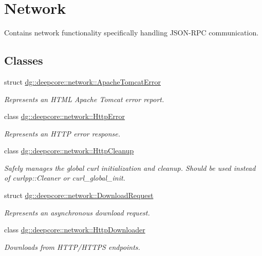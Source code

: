 \hypertarget{group___network_module}{}\section{Network}
\label{group___network_module}


Contains network functionality specifically handling J\+S\+O\+N-\/\+R\+PC communication.  


\subsection*{Classes}
\begin{DoxyCompactItemize}
\item 
struct \hyperlink{structdg_1_1deepcore_1_1network_1_1_apache_tomcat_error}{dg\+::deepcore\+::network\+::\+Apache\+Tomcat\+Error}
\begin{DoxyCompactList}\small\item\em Represents an H\+T\+ML Apache Tomcat error report. \end{DoxyCompactList}\item 
class \hyperlink{classdg_1_1deepcore_1_1network_1_1_http_error}{dg\+::deepcore\+::network\+::\+Http\+Error}
\begin{DoxyCompactList}\small\item\em Represents an H\+T\+TP error response. \end{DoxyCompactList}\item 
class \hyperlink{classdg_1_1deepcore_1_1network_1_1_http_cleanup}{dg\+::deepcore\+::network\+::\+Http\+Cleanup}
\begin{DoxyCompactList}\small\item\em Safely manages the global curl initialization and cleanup. Should be used instead of curlpp\+::\+Cleaner or curl\+\_\+global\+\_\+init. \end{DoxyCompactList}\item 
struct \hyperlink{structdg_1_1deepcore_1_1network_1_1_download_request}{dg\+::deepcore\+::network\+::\+Download\+Request}
\begin{DoxyCompactList}\small\item\em Represents an asynchronous download request. \end{DoxyCompactList}\item 
class \hyperlink{classdg_1_1deepcore_1_1network_1_1_http_downloader}{dg\+::deepcore\+::network\+::\+Http\+Downloader}
\begin{DoxyCompactList}\small\item\em Downloads from H\+T\+T\+P/\+H\+T\+T\+PS endpoints. \end{DoxyCompactList}\item 

\end{DoxyCompactItemize}
